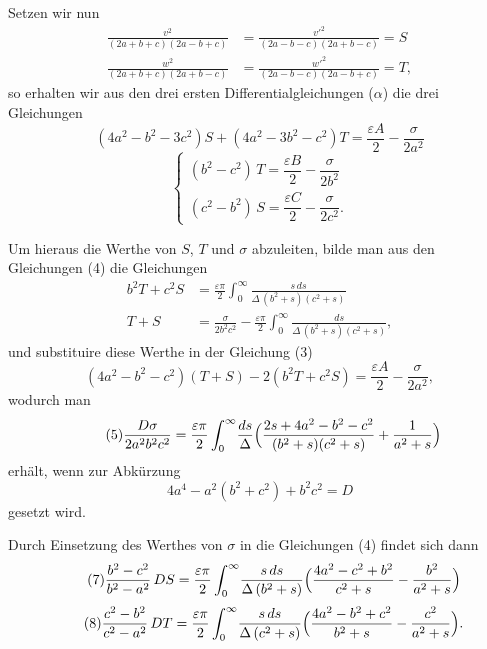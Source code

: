 \documentclass[12pt,a4paper]{article}
\begin{document}
Setzen wir nun
\begin{equation}
\tag{2}
\begin{aligned} \frac{v^2}{(2a+b+c)(2a-b+c)} &= \frac{v'^2}{(2a-b-c)(2a+b-c)} = S\\ \frac{w^2}{(2a+b+c)(2a+b-c)} &= \frac{w'^2}{(2a-b-c)(2a-b+c)} = T, \end{aligned}
\end{equation}
so erhalten wir aus den drei ersten Differentialgleichungen ($\alpha$) die drei Gleichungen
\begin{equation}
\tag{3} (4a^2 - b^2 - 3c^2)S + (4a^2 - 3b^2 - c^2)T = \frac{\varepsilon A}{2} - \frac{\sigma}{2a^2} \end{equation}
\begin{equation}
\tag{4}
\begin{cases} (b^2 - c^2)\,T = \dfrac{\varepsilon B}{2} - \dfrac{\sigma}{2b^2}\\[1ex] (c^2 - b^2)\,S = \dfrac{\varepsilon C}{2} - \dfrac{\sigma}{2c^2}. \end{cases}
\end{equation}

Um hieraus die Werthe von $S$, $T$ und $\sigma$ abzuleiten, bilde man aus den Gleichungen (4) die Gleichungen
\begin{align*} b^2T + c^2S &= \frac{\varepsilon\pi}{2}\int_0^{\infty}\!\frac{s\,ds}{\Delta\,(b^2+s)(c^2+s)}\\ T + S &= \frac{\sigma}{2b^2c^2} - \frac{\varepsilon\pi}{2}\int_0^{\infty}\!\frac{ds}{\Delta\,(b^2+s)(c^2+s)}, \end{align*}
und substituire diese Werthe in der Gleichung (3)
\[
(4a^2 - b^2 - c^2)(T+S) - 2(b^2T + c^2S) = \frac{\varepsilon A}{2} - \frac{\sigma}{2a^2},
\]
wodurch man
\begin{equation}
\tag{5} \frac{D\sigma}{2a^2b^2c^2} = \frac{\varepsilon\pi}{2}\int_0^{\infty}\!\frac{ds}{\Delta}\Bigl(\frac{2s + 4a^2 - b^2 - c^2}{(b^2+s)(c^2+s)} + \frac{1}{a^2+s}\Bigr) \end{equation}
erhält, wenn zur Abkürzung
\begin{equation}
\tag{6} 4a^4 - a^2(b^2 + c^2) + b^2c^2 = D \end{equation}
gesetzt wird.

Durch Einsetzung des Werthes von $\sigma$ in die Gleichungen (4) findet sich dann
\begin{equation}
\tag{7} \frac{b^2 - c^2}{b^2 - a^2}\,DS = \frac{\varepsilon\pi}{2}\int_0^{\infty}\!\frac{s\,ds}{\Delta\,(b^2+s)}\Bigl(\frac{4a^2 - c^2 + b^2}{c^2+s} - \frac{b^2}{a^2+s}\Bigr) \end{equation}
\begin{equation}
\tag{8} \frac{c^2 - b^2}{c^2 - a^2}\,DT = \frac{\varepsilon\pi}{2}\int_0^{\infty}\!\frac{s\,ds}{\Delta\,(c^2+s)}\Bigl(\frac{4a^2 - b^2 + c^2}{b^2+s} - \frac{c^2}{a^2+s}\Bigr). \end{equation}
\end{document}
